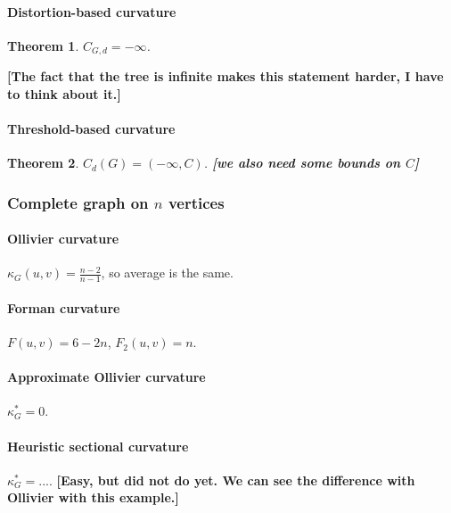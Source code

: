 \documentclass{article} %
\newtheorem{theorem}{Theorem}[section]
\begin{document}
\paragraph{Distortion-based curvature} 

\begin{theorem}\label{thm:tree_distortion} $C_{G,d} = -\infty$.
\end{theorem}

\textbf{[The fact that the tree is infinite makes this statement harder, I have to think about it.]}

\paragraph{Threshold-based curvature} 

\begin{theorem}\label{thm:tree_threshold}
$C_d(G) = (-\infty, C)$.
\textbf{[we also need some bounds on $C$]}
\end{theorem}




\subsubsection{Complete graph on $n$ vertices}

\paragraph{Ollivier curvature}  
$\kappa_G(u,v) = \frac{n-2}{n-1}$, so average is the same.

\paragraph{Forman curvature} 

$F(u,v) = 6 - 2n$, $F_2(u,v) = n$.

\paragraph{Approximate Ollivier curvature} 

$\kappa_G^* = 0$.

\paragraph{Heuristic sectional curvature} 

$\kappa_G^* = ...$. \textbf{[Easy, but did not do yet. We can see the difference with Ollivier with this example.]}
\end{document}
